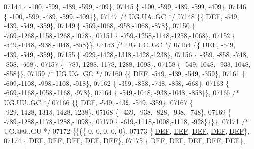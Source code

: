 \begin{DoxyCode}
07144 \{ -100, -599, -489, -599, -409\},
07145 \{ -100, -599, -489, -599, -409\},
07146 \{ -100, -599, -489, -599, -409\}\},
07147 \textcolor{comment}{/* UG.UA..GC */}
07148 \{\{  \mbox{\hyperlink{1_88_84__epars_8h_a397419fc12b37ed479c8abb9d444d843}{DEF}}, -549, -439, -549, -359\},
07149 \{ -569,-1068, -958,-1068, -878\},
07150 \{ -769,-1268,-1158,-1268,-1078\},
07151 \{ -759,-1258,-1148,-1258,-1068\},
07152 \{ -549,-1048, -938,-1048, -858\}\},
07153 \textcolor{comment}{/* UG.UC..GC */}
07154 \{\{  \mbox{\hyperlink{1_88_84__epars_8h_a397419fc12b37ed479c8abb9d444d843}{DEF}}, -549, -439, -549, -359\},
07155 \{ -929,-1428,-1318,-1428,-1238\},
07156 \{ -359, -858, -748, -858, -668\},
07157 \{ -789,-1288,-1178,-1288,-1098\},
07158 \{ -549,-1048, -938,-1048, -858\}\},
07159 \textcolor{comment}{/* UG.UG..GC */}
07160 \{\{  \mbox{\hyperlink{1_88_84__epars_8h_a397419fc12b37ed479c8abb9d444d843}{DEF}}, -549, -439, -549, -359\},
07161 \{ -609,-1108, -998,-1108, -918\},
07162 \{ -359, -858, -748, -858, -668\},
07163 \{ -669,-1168,-1058,-1168, -978\},
07164 \{ -549,-1048, -938,-1048, -858\}\},
07165 \textcolor{comment}{/* UG.UU..GC */}
07166 \{\{  \mbox{\hyperlink{1_88_84__epars_8h_a397419fc12b37ed479c8abb9d444d843}{DEF}}, -549, -439, -549, -359\},
07167 \{ -929,-1428,-1318,-1428,-1238\},
07168 \{ -439, -938, -828, -938, -748\},
07169 \{ -789,-1288,-1178,-1288,-1098\},
07170 \{ -619,-1118,-1008,-1118, -928\}\}\}\},
07171 \textcolor{comment}{/* UG.@@..GU */}
07172 \{\{\{\{    0,    0,    0,    0,    0\},
07173 \{  \mbox{\hyperlink{1_88_84__epars_8h_a397419fc12b37ed479c8abb9d444d843}{DEF}},  \mbox{\hyperlink{1_88_84__epars_8h_a397419fc12b37ed479c8abb9d444d843}{DEF}},  \mbox{\hyperlink{1_88_84__epars_8h_a397419fc12b37ed479c8abb9d444d843}{DEF}},  \mbox{\hyperlink{1_88_84__epars_8h_a397419fc12b37ed479c8abb9d444d843}{DEF}},  \mbox{\hyperlink{1_88_84__epars_8h_a397419fc12b37ed479c8abb9d444d843}{DEF}}\},
07174 \{  \mbox{\hyperlink{1_88_84__epars_8h_a397419fc12b37ed479c8abb9d444d843}{DEF}},  \mbox{\hyperlink{1_88_84__epars_8h_a397419fc12b37ed479c8abb9d444d843}{DEF}},  \mbox{\hyperlink{1_88_84__epars_8h_a397419fc12b37ed479c8abb9d444d843}{DEF}},  \mbox{\hyperlink{1_88_84__epars_8h_a397419fc12b37ed479c8abb9d444d843}{DEF}},  \mbox{\hyperlink{1_88_84__epars_8h_a397419fc12b37ed479c8abb9d444d843}{DEF}}\},
07175 \{  \mbox{\hyperlink{1_88_84__epars_8h_a397419fc12b37ed479c8abb9d444d843}{DEF}},  \mbox{\hyperlink{1_88_84__epars_8h_a397419fc12b37ed479c8abb9d444d843}{DEF}},  \mbox{\hyperlink{1_88_84__epars_8h_a397419fc12b37ed479c8abb9d444d843}{DEF}},  \mbox{\hyperlink{1_88_84__epars_8h_a397419fc12b37ed479c8abb9d444d843}{DEF}},  \mbox{\hyperlink{1_88_84__epars_8h_a397419fc12b37ed479c8abb9d444d843}{DEF}}\},

\end{DoxyCode}
